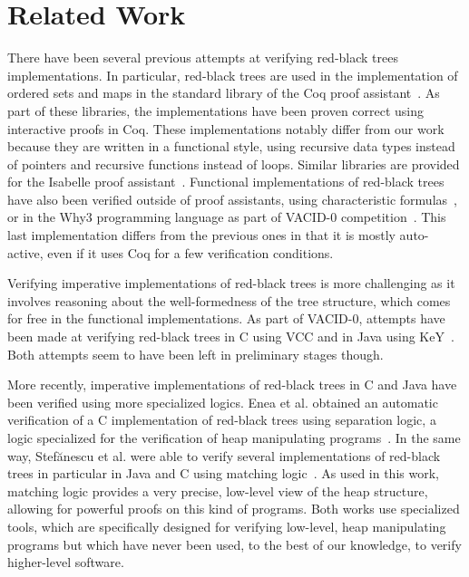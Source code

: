 \documentclass{llncs}
\begin{document}
\section{Related Work}
\label{related-work}
There have been several previous attempts at verifying red-black trees implementations. In particular, red-black trees are
used in the implementation of ordered sets and maps in the standard library of the Coq proof
assistant~\cite{appel2011efficient,filliatre2004functors}. As part of these libraries, the implementations have been proven
correct using interactive proofs in Coq. These implementations notably differ from our work because they are written in
a functional style, using recursive data types instead of pointers and recursive functions instead of loops. Similar
libraries are provided for the Isabelle proof assistant~\cite{lammich2010isabelle}. Functional implementations of
red-black trees have also been verified outside of proof assistants, using characteristic formulas~\cite{chargueraud2010program},
or in the Why3 programming language as part of VACID-0 competition~\cite{leino2010vacid}. This last implementation differs from
the previous ones in that it is mostly auto-active, even if it uses Coq for a few verification conditions.

Verifying imperative implementations of red-black trees is more challenging as it involves reasoning about the well-formedness
of the tree structure, which comes for free in the functional implementations. As part of VACID-0, attempts have been made at
verifying red-black trees in C using VCC and in Java using KeY~\cite{bruns2011specification}.
Both attempts seem to have been left in preliminary stages
though.

More recently, imperative implementations of red-black trees in C and Java have been verified using more specialized logics.
Enea et al. obtained an automatic verification of a C implementation of red-black trees using separation logic, a logic
specialized for the verification of heap manipulating programs~\cite{enea2015automated}. In the
same way, Stef{\u{a}}nescu et al. were able to verify several implementations of red-black trees in particular in Java and
C using matching logic~\cite{stefuanescu2016semantics}. As used in this work, matching logic provides a very precise,
low-level view of the heap structure, allowing for powerful proofs on this kind of programs. Both works use specialized tools,
which are specifically designed for verifying low-level, heap manipulating programs but which have never been used, to the best
of our knowledge, to verify higher-level software.
\end{document}
